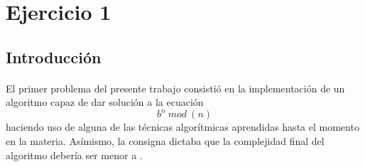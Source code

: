 \section{Ejercicio 1}

\subsection{Introducción}

\paragraph{}
El primer problema del presente trabajo consistió en la implementación de un algoritmo capaz de dar solución a la ecuación 
	\begin{equation} 
		b^n\ mod\ (n)
	\label{problema}
	\end{equation}
haciendo uso de alguna de las técnicas algorítmicas aprendidas hasta el momento en la materia. Asímismo, la consigna dictaba que la complejidad final del algoritmo debería ser menor a .

